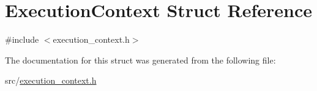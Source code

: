 \hypertarget{struct_execution_context}{}\section{Execution\+Context Struct Reference}
\label{struct_execution_context}


{\ttfamily \#include $<$execution\+\_\+context.\+h$>$}



The documentation for this struct was generated from the following file\+:\begin{DoxyCompactItemize}
\item 
src/\hyperlink{execution__context_8h}{execution\+\_\+context.\+h}\end{DoxyCompactItemize}
